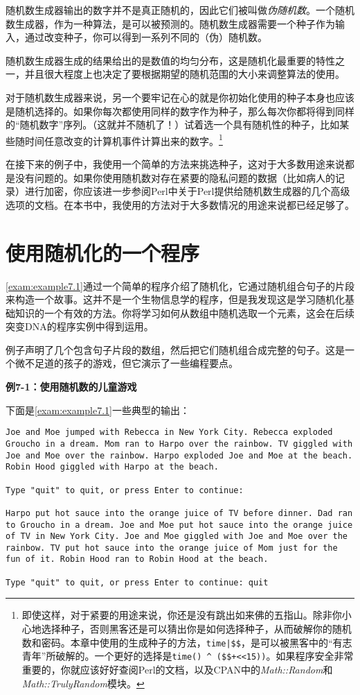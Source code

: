 随机数生成器输出的数字并不是真正随机的，因此它们被叫做\textit{伪随机数}。一个随机数生成器，作为一种算法，是可以被预测的。随机数生成器需要一个种子作为输入，通过改变种子，你可以得到一系列不同的（伪）随机数。

随机数生成器生成的结果给出的是数值的均匀分布，这是随机化最重要的特性之一，并且很大程度上也决定了要根据期望的随机范围的大小来调整算法的使用。

对于随机数生成器来说，另一个要牢记在心的就是你初始化使用的种子本身也应该是随机选择的。如果你每次都使用同样的数字作为种子，那么每次你都将得到同样的“随机数字”序列。（这就并不随机了！）试着选一个具有随机性的种子，比如某些随时间任意改变的计算机事件计算出来的数字。\footnote{即使这样，对于紧要的用途来说，你还是没有跳出如来佛的五指山。除非你小心地选择种子，否则黑客还是可以猜出你是如何选择种子，从而破解你的随机数和密码。本章中使用的生成种子的方法，\verb=time|$$=，是可以被黑客中的“有志青年”所破解的。一个更好的选择是\verb=time() ^ ($$+<<15))=。如果程序安全非常重要的，你就应该好好查阅Perl的文档，以及CPAN中的\textit{Math::Random}和\textit{Math::TrulyRandom}模块。}

在接下来的例子中，我使用一个简单的方法来挑选种子，这对于大多数用途来说都是没有问题的。如果你使用随机数对存在紧要的隐私问题的数据（比如病人的记录）进行加密，你应该进一步参阅Perl中关于Perl提供给随机数生成器的几个高级选项的文档。在本书中，我使用的方法对于大多数情况的用途来说都已经足够了。

\section{使用随机化的一个程序}
\autoref{exam:example7.1}通过一个简单的程序介绍了随机化，它通过随机组合句子的片段来构造一个故事。这并不是一个生物信息学的程序，但是我发现这是学习随机化基础知识的一个有效的方法。你将学习如何从数组中随机选取一个元素，这会在后续突变DNA的程序实例中得到运用。

例子声明了几个包含句子片段的数组，然后把它们随机组合成完整的句子。这是一个微不足道的孩子的游戏，但它演示了一些编程要点。

\textbf{例7-1：使用随机数的儿童游戏}


下面是\autoref{exam:example7.1}一些典型的输出：

\begin{lstlisting}
Joe and Moe jumped with Rebecca in New York City. Rebecca exploded Groucho in a dream. Mom ran to Harpo over the rainbow. TV giggled with Joe and Moe over the rainbow. Harpo exploded Joe and Moe at the beach. Robin Hood giggled with Harpo at the beach. 

Type "quit" to quit, or press Enter to continue: 

Harpo put hot sauce into the orange juice of TV before dinner. Dad ran to Groucho in a dream. Joe and Moe put hot sauce into the orange juice of TV in New York City. Joe and Moe giggled with Joe and Moe over the rainbow. TV put hot sauce into the orange juice of Mom just for the fun of it. Robin Hood ran to Robin Hood at the beach. 

Type "quit" to quit, or press Enter to continue: quit
\end{lstlisting}

